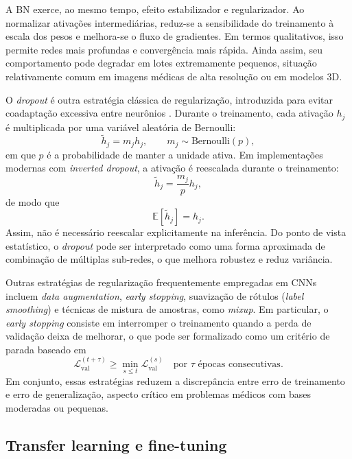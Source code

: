 \documentclass[tcc,capa]{texufpel}
\begin{document}
A BN exerce, ao mesmo tempo, efeito estabilizador e regularizador. Ao normalizar ativações intermediárias, reduz-se a sensibilidade do treinamento à escala dos pesos e melhora-se o fluxo de gradientes. Em termos qualitativos, isso permite redes mais profundas e convergência mais rápida. Ainda assim, seu comportamento pode degradar em lotes extremamente pequenos, situação relativamente comum em imagens médicas de alta resolução ou em modelos 3D.

O \textit{dropout} é outra estratégia clássica de regularização, introduzida para evitar coadaptação excessiva entre neurônios \cite{Srivastava2014}. Durante o treinamento, cada ativação $h_j$ é multiplicada por uma variável aleatória de Bernoulli:
\begin{equation}
\tilde{h}_j = m_j h_j,
\qquad
m_j \sim \text{Bernoulli}(p),
\end{equation}
em que $p$ é a probabilidade de manter a unidade ativa. Em implementações modernas com \textit{inverted dropout}, a ativação é reescalada durante o treinamento:
\begin{equation}
\tilde{h}_j = \frac{m_j}{p} h_j,
\end{equation}
de modo que
\begin{equation}
\mathbb{E}[\tilde{h}_j] = h_j.
\end{equation}
Assim, não é necessário reescalar explicitamente na inferência. Do ponto de vista estatístico, o \textit{dropout} pode ser interpretado como uma forma aproximada de combinação de múltiplas sub-redes, o que melhora robustez e reduz variância.

Outras estratégias de regularização frequentemente empregadas em CNNs incluem \textit{data augmentation}, \textit{early stopping}, suavização de rótulos (\textit{label smoothing}) e técnicas de mistura de amostras, como \textit{mixup}. Em particular, o \textit{early stopping} consiste em interromper o treinamento quando a perda de validação deixa de melhorar, o que pode ser formalizado como um critério de parada baseado em
\begin{equation}
\mathcal{L}_{\text{val}}^{(t+\tau)} \geq \min_{s \leq t}\mathcal{L}_{\text{val}}^{(s)}
\quad \text{por } \tau \text{ épocas consecutivas}.
\end{equation}
Em conjunto, essas estratégias reduzem a discrepância entre erro de treinamento e erro de generalização, aspecto crítico em problemas médicos com bases moderadas ou pequenas.

\subsection{Transfer learning e fine-tuning}
\end{document}
